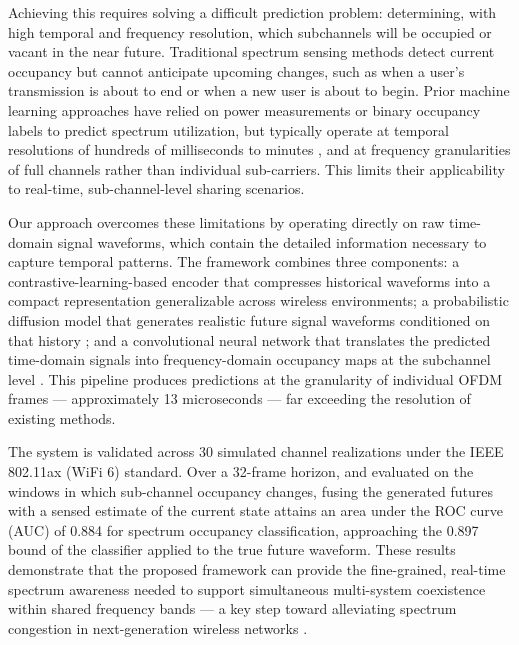\documentclass[lettersize,journal]{IEEEtran}
\begin{document}
Achieving this requires solving a difficult prediction problem: determining, with high temporal and frequency resolution, which subchannels will be occupied or vacant in the near future. Traditional spectrum sensing methods detect current occupancy but cannot anticipate upcoming changes, such as when a user's transmission is about to end or when a new user is about to begin. Prior machine learning approaches have relied on power measurements or binary occupancy labels to predict spectrum utilization, but typically operate at temporal resolutions of hundreds of milliseconds to minutes \cite{intro_ref1, intro_ref4, intro_ref7, intro_ref8, intro_ref9, intro_ref12, intro_ref13, intro_ref14, intro_ref15, Saad_2016, intro_ref17, intro_ref18, intro_ref19, intro_ref20}, and at frequency granularities of full channels rather than individual sub-carriers. This limits their applicability to real-time, sub-channel-level sharing scenarios.

Our approach overcomes these limitations by operating directly on raw time-domain signal waveforms, which contain the detailed information necessary to capture temporal patterns. The framework combines three components: a contrastive-learning-based encoder that compresses historical waveforms into a compact representation generalizable across wireless environments; a probabilistic diffusion model that generates realistic future signal waveforms conditioned on that history \cite{intro_ref10}; and a convolutional neural network that translates the predicted time-domain signals into frequency-domain occupancy maps at the subchannel level \cite{intro_ref11}. This pipeline produces predictions at the granularity of individual OFDM frames — approximately 13 microseconds — far exceeding the resolution of existing methods.

The system is validated across 30 simulated channel realizations under the IEEE 802.11ax (WiFi 6) standard. Over a 32-frame horizon, and evaluated on the windows in which sub-channel occupancy changes, fusing the generated futures with a sensed estimate of the current state attains an area under the ROC curve (AUC) of 0.884 for spectrum occupancy classification, approaching the 0.897 bound of the classifier applied to the true future waveform. These results demonstrate that the proposed framework can provide the fine-grained, real-time spectrum awareness needed to support simultaneous multi-system coexistence within shared frequency bands — a key step toward alleviating spectrum congestion in next-generation wireless networks \cite{intro_ref17, intro_ref18, intro_ref19}.
\end{document}
